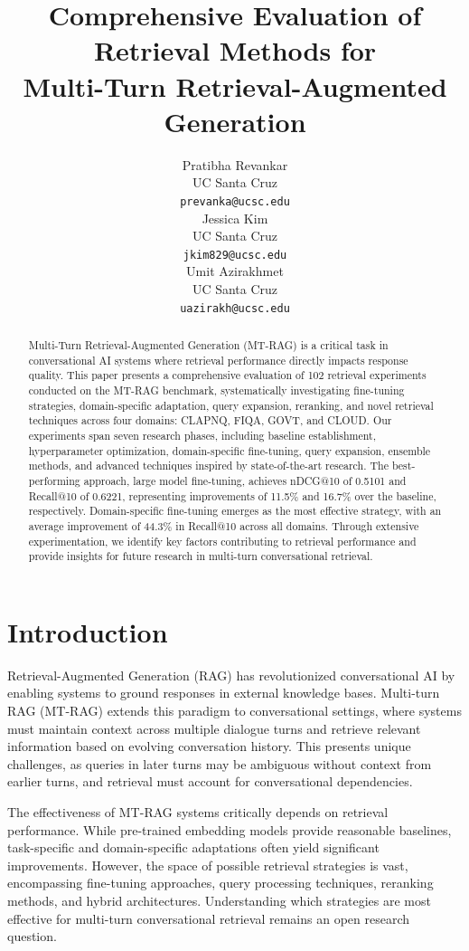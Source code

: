 \documentclass[11pt]{article}
\title{Comprehensive Evaluation of Retrieval Methods for\\Multi-Turn Retrieval-Augmented Generation}
\author{%
  Pratibha Revankar \\
  UC Santa Cruz \\
  \texttt{prevanka@ucsc.edu} \\
  \And
  Jessica Kim \\
  UC Santa Cruz \\
  \texttt{jkim829@ucsc.edu} \\
  \And
  Umit Azirakhmet \\
  UC Santa Cruz \\
  \texttt{uazirakh@ucsc.edu} \\
}
\begin{document}
\maketitle

\begin{abstract}
Multi-Turn Retrieval-Augmented Generation (MT-RAG) is a critical task in conversational AI systems where retrieval performance directly impacts response quality. This paper presents a comprehensive evaluation of 102 retrieval experiments conducted on the MT-RAG benchmark, systematically investigating fine-tuning strategies, domain-specific adaptation, query expansion, reranking, and novel retrieval techniques across four domains: CLAPNQ, FIQA, GOVT, and CLOUD. Our experiments span seven research phases, including baseline establishment, hyperparameter optimization, domain-specific fine-tuning, query expansion, ensemble methods, and advanced techniques inspired by state-of-the-art research. The best-performing approach, large model fine-tuning, achieves nDCG@10 of 0.5101 and Recall@10 of 0.6221, representing improvements of 11.5\% and 16.7\% over the baseline, respectively. Domain-specific fine-tuning emerges as the most effective strategy, with an average improvement of 44.3\% in Recall@10 across all domains. Through extensive experimentation, we identify key factors contributing to retrieval performance and provide insights for future research in multi-turn conversational retrieval.
\end{abstract}

\section{Introduction}

Retrieval-Augmented Generation (RAG) has revolutionized conversational AI by enabling systems to ground responses in external knowledge bases. Multi-turn RAG (MT-RAG) extends this paradigm to conversational settings, where systems must maintain context across multiple dialogue turns and retrieve relevant information based on evolving conversation history. This presents unique challenges, as queries in later turns may be ambiguous without context from earlier turns, and retrieval must account for conversational dependencies.

The effectiveness of MT-RAG systems critically depends on retrieval performance. While pre-trained embedding models provide reasonable baselines, task-specific and domain-specific adaptations often yield significant improvements. However, the space of possible retrieval strategies is vast, encompassing fine-tuning approaches, query processing techniques, reranking methods, and hybrid architectures. Understanding which strategies are most effective for multi-turn conversational retrieval remains an open research question.
\end{document}
